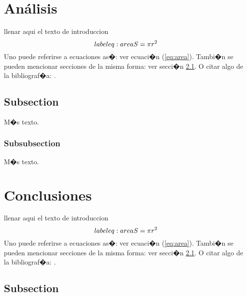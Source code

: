 \documentclass{article}
\theoremstyle{definition}
\theoremstyle{remark}
\begin{document}
\section{An\'alisis}

llenar aqui el texto de introduccion
\begin{equation}\\label{eq:area}
  S = \pi r^2
\end{equation}
Uno puede referirse a ecuaciones as�: ver ecuaci�n (\ref{eq:area}).
Tambi�n se pueden mencionar secciones de la misma forma: ver secci�n
\ref{sec:nada}. O citar algo de la bibliograf�a: \cite{Cd94}.

\subsection{Subsection}\label{sec:nada}

M�s texto.

\subsubsection{Subsubsection}\label{sec:nada2}

M�s texto.






\section{Conclusiones}

llenar aqui el texto de introduccion
\begin{equation}\\label{eq:area}
  S = \pi r^2
\end{equation}
Uno puede referirse a ecuaciones as�: ver ecuaci�n (\ref{eq:area}).
Tambi�n se pueden mencionar secciones de la misma forma: ver secci�n
\ref{sec:nada}. O citar algo de la bibliograf�a: \cite{Cd94}.

\subsection{Subsection}\label{sec:nada}
\end{document}

